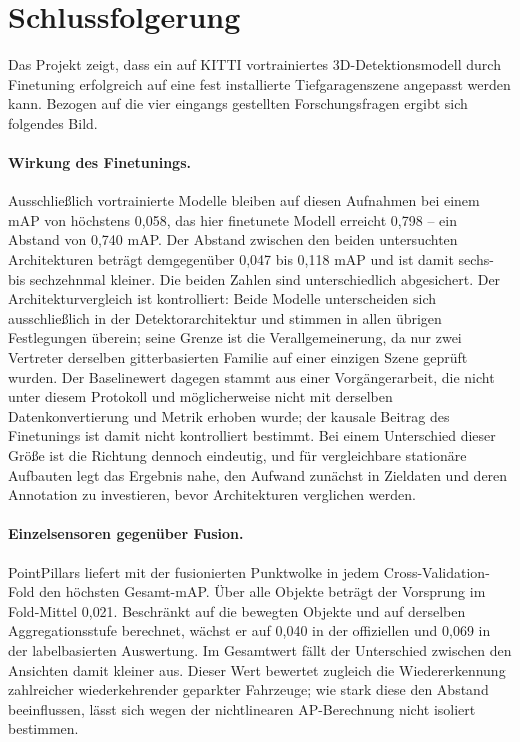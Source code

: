 \section{Schlussfolgerung}

Das Projekt zeigt, dass ein auf KITTI vortrainiertes 3D-Detektionsmodell durch Finetuning erfolgreich auf eine fest installierte Tiefgaragenszene angepasst werden kann. Bezogen auf die vier eingangs gestellten Forschungsfragen ergibt sich folgendes Bild.

\paragraph{Wirkung des Finetunings.} Ausschließlich vortrainierte Modelle bleiben auf diesen Aufnahmen bei einem mAP von höchstens 0{,}058, das hier finetunete Modell erreicht 0{,}798 -- ein Abstand von 0{,}740 mAP. Der Abstand zwischen den beiden untersuchten Architekturen beträgt demgegenüber 0{,}047 bis 0{,}118 mAP und ist damit sechs- bis sechzehnmal kleiner. Die beiden Zahlen sind unterschiedlich abgesichert. Der Architekturvergleich ist kontrolliert: Beide Modelle unterscheiden sich ausschließlich in der Detektorarchitektur und stimmen in allen übrigen Festlegungen überein; seine Grenze ist die Verallgemeinerung, da nur zwei Vertreter derselben gitterbasierten Familie auf einer einzigen Szene geprüft wurden. Der Baselinewert dagegen stammt aus einer Vorgängerarbeit, die nicht unter diesem Protokoll und möglicherweise nicht mit derselben Datenkonvertierung und Metrik erhoben wurde; der kausale Beitrag des Finetunings ist damit nicht kontrolliert bestimmt. Bei einem Unterschied dieser Größe ist die Richtung dennoch eindeutig, und für vergleichbare stationäre Aufbauten legt das Ergebnis nahe, den Aufwand zunächst in Zieldaten und deren Annotation zu investieren, bevor Architekturen verglichen werden.

\paragraph{Einzelsensoren gegenüber Fusion.} PointPillars liefert mit der fusionierten Punktwolke in jedem Cross-Validation-Fold den höchsten Gesamt-mAP. Über alle Objekte beträgt der Vorsprung im Fold-Mittel 0{,}021. Beschränkt auf die bewegten Objekte und auf derselben Aggregationsstufe berechnet, wächst er auf 0{,}040 in der offiziellen und 0{,}069 in der labelbasierten Auswertung. Im Gesamtwert fällt der Unterschied zwischen den Ansichten damit kleiner aus. Dieser Wert bewertet zugleich die Wiedererkennung zahlreicher wiederkehrender geparkter Fahrzeuge; wie stark diese den Abstand beeinflussen, lässt sich wegen der nichtlinearen AP-Berechnung nicht isoliert bestimmen.

